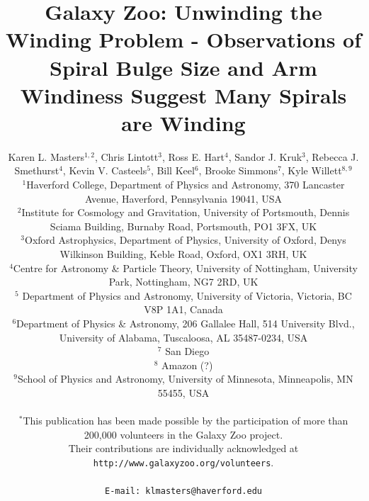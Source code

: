 \documentclass[usenatbib]{mn2e}
\newcommand{\etal}{{\it et al.}}
\begin{document}
\title[Galaxy Zoo: Unwinding the Winding Problem]{Galaxy Zoo: Unwinding the Winding Problem - Observations of Spiral Bulge Size and Arm Windiness Suggest Many Spirals are Winding}
\author[K.L. Masters \etal]{Karen L. Masters$^{1,2}$, Chris Lintott$^{3}$, Ross E. Hart$^{4}$, Sandor J. Kruk$^{3}$, \newauthor Rebecca J. Smethurst$^{4}$,  Kevin V. Casteels$^5$, Bill Keel$^6$, Brooke Simmons$^7$, \newauthor  Kyle Willett$^{8,9}$  \\
$^1$Haverford College, Department of Physics and Astronomy, 370 Lancaster Avenue, Haverford, Pennsylvania 19041, USA\\
$^2$Institute for Cosmology and Gravitation, University of Portsmouth, Dennis Sciama Building, Burnaby Road, Portsmouth, PO1 3FX, UK \\
 $^{3}$Oxford Astrophysics, Department of Physics, University of Oxford, Denys Wilkinson Building, Keble Road, Oxford, OX1 3RH, UK\\
 $^4$Centre for Astronomy \& Particle Theory, University of Nottingham, University Park, Nottingham, NG7 2RD, UK\\
 $^5$ Department of Physics and Astronomy, University of Victoria, Victoria, BC V8P 1A1, Canada\\
 $^6$Department of Physics \& Astronomy, 206 Gallalee Hall, 514 University Blvd., University of Alabama, Tuscaloosa, AL 35487-0234, USA\\
 $^7$ San Diego \\
 $^8$ Amazon (?)\\ 
 $^9$School of Physics and Astronomy, University of Minnesota, Minneapolis, MN 55455, USA\\
\\
 $^*$This publication has been made possible by the participation of more than 200,000 volunteers in the Galaxy Zoo project. \\ Their contributions are individually acknowledged at \texttt{http://www.galaxyzoo.org/volunteers}. \\
\\
{\tt E-mail: klmasters@haverford.edu}
 }

 

\maketitle
\end{document}
